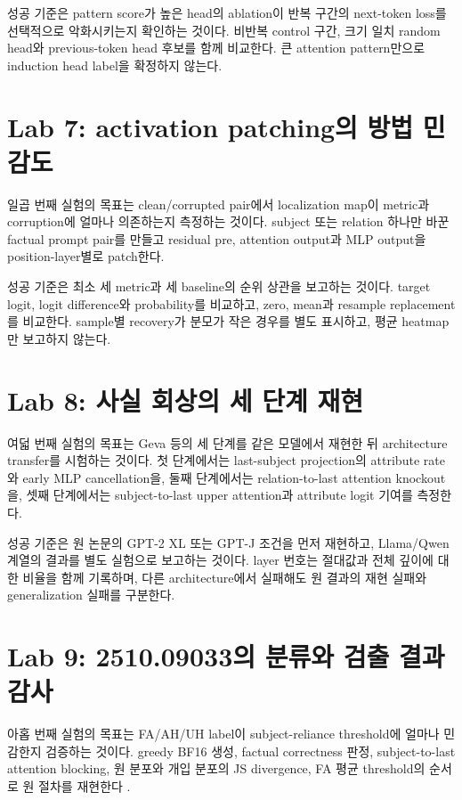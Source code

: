 성공 기준은 pattern score가 높은 head의 ablation이 반복 구간의 next-token loss를 선택적으로 악화시키는지 확인하는 것이다.
비반복 control 구간, 크기 일치 random head와 previous-token head 후보를 함께 비교한다.
큰 attention pattern만으로 induction head label을 확정하지 않는다.

\section{Lab 7: activation patching의 방법 민감도}

일곱 번째 실험의 목표는 clean/corrupted pair에서 localization map이 metric과 corruption에 얼마나 의존하는지 측정하는 것이다.
subject 또는 relation 하나만 바꾼 factual prompt pair를 만들고 residual pre, attention output과 MLP output을 position-layer별로 patch한다.

성공 기준은 최소 세 metric과 세 baseline의 순위 상관을 보고하는 것이다.
target logit, logit difference와 probability를 비교하고, zero, mean과 resample replacement를 비교한다.
sample별 recovery가 분모가 작은 경우를 별도 표시하고, 평균 heatmap만 보고하지 않는다.

\section{Lab 8: 사실 회상의 세 단계 재현}

여덟 번째 실험의 목표는 Geva 등의 세 단계를 같은 모델에서 재현한 뒤 architecture transfer를 시험하는 것이다.
첫 단계에서는 last-subject projection의 attribute rate와 early MLP cancellation을, 둘째 단계에서는 relation-to-last attention knockout을, 셋째 단계에서는 subject-to-last upper attention과 attribute logit 기여를 측정한다.

성공 기준은 원 논문의 GPT-2 XL 또는 GPT-J 조건을 먼저 재현하고, Llama/Qwen 계열의 결과를 별도 실험으로 보고하는 것이다.
layer 번호는 절대값과 전체 깊이에 대한 비율을 함께 기록하며, 다른 architecture에서 실패해도 원 결과의 재현 실패와 generalization 실패를 구분한다.

\section{Lab 9: 2510.09033의 분류와 검출 결과 감사}

아홉 번째 실험의 목표는 FA/AH/UH label이 subject-reliance threshold에 얼마나 민감한지 검증하는 것이다.
greedy BF16 생성, factual correctness 판정, subject-to-last attention blocking, 원 분포와 개입 분포의 JS divergence, FA 평균 threshold의 순서로 원 절차를 재현한다 \citep{cheang2026knowledge}.

